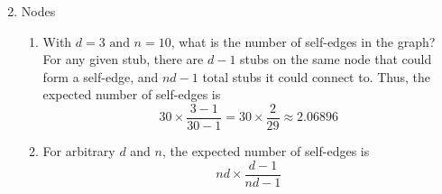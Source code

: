 \documentclass{article}
\begin{document}
\begin{enumerate}
\begin{enumerate}[label=\arabic*.]
\begin{equation*}
                    \end{equation*}
          \end{enumerate}
    \item Nodes
          \begin{enumerate}[label=\arabic*.]
              \item With \(d = 3 \text{ and } n = 10\), what is the number of self-edges in the graph? \\
                    For any given stub, there are \(d - 1\) stubs on the same node that could form a self-edge,
                    and \(nd - 1\) total stubs it could connect to. Thus, the expected number of self-edges is
                    \begin{equation*}
                        30 \times \frac{3 - 1}{30 - 1} = 30 \times \frac{2}{29} \approx 2.06896
                    \end{equation*}
              \item For arbitrary \(d\) and \(n\), the expected number of self-edges is
                    \begin{equation*}
                        nd \times \frac{d - 1}{nd - 1}
                    \end{equation*}
          \end{enumerate}
\end{enumerate}
\end{document}
